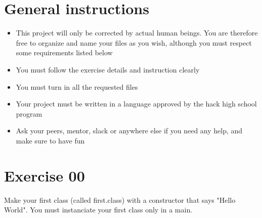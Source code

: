 \documentclass{42-en}
\begin{document}
\chapter{General instructions}

	    \begin{itemize}
		\item This project will only be corrected by actual human beings.
		You are therefore free to organize and name your files as you wish,
		although you must respect some requirements listed below
		\item You must follow the exercise details and instruction clearly
		\item You must turn in all the requested files
		\item Your project must be written in a language approved by
		the hack high school program
		\item Ask your peers, mentor, slack or anywhere else if you need
		any help, and make sure to have fun
	\end{itemize}

\chapter{Exercise 00}


\makeheaderfiles

Make your first class (called first.class) with a constructor that says "Hello World". You must instanciate your first class only in a main.

\end{document}
